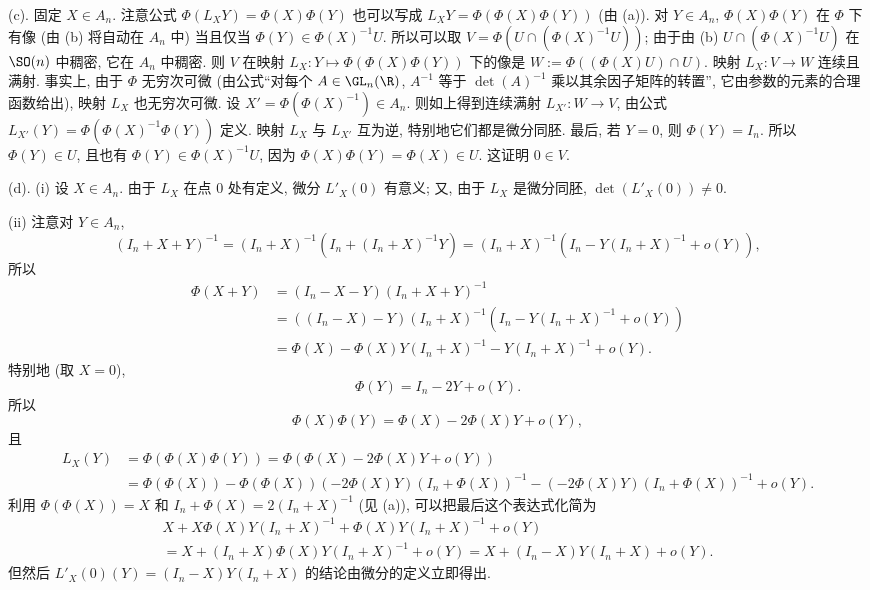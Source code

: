 \begin{solution}
(c). 固定 $X \in A_n$. 注意公式 $\Phi(L_XY) = \Phi(X)\Phi(Y)$ 也可以写成 $L_XY = \Phi(\Phi(X)\Phi(Y))$ (由 (a)).
对 $Y \in A_n$, $\Phi(X)\Phi(Y)$ 在 $\Phi$ 下有像 (由 (b) 将自动在 $A_n$ 中) 当且仅当 $\Phi(Y) \in \Phi(X)^{-1}U$. 所以可以取 $V = \Phi(U \cap (\Phi(X)^{-1}U))$; 由于由 (b) $U \cap (\Phi(X)^{-1}U)$ 在 $\SO(n)$ 中稠密, 它在 $A_n$ 中稠密. 则 $V$ 在映射 $L_X \colon Y \longmapsto \Phi(\Phi(X)\Phi(Y))$ 下的像是 $W := \Phi((\Phi(X)U) \cap U)$.
映射 $L_X \colon V \to W$ 连续且满射. 事实上, 由于 $\Phi$ 无穷次可微 (由公式``对每个 $A \in \GL_n(\R)$, $A^{-1}$ 等于 $\det(A)^{-1}$ 乘以其余因子矩阵的转置'', 它由参数的元素的合理函数给出), 映射 $L_X$ 也无穷次可微.
设 $X' = \Phi(\Phi(X)^{-1}) \in A_n$. 则如上得到连续满射 $L_{X'} \colon W \to V$, 由公式 $L_{X'}(Y) = \Phi(\Phi(X)^{-1}\Phi(Y))$ 定义. 映射 $L_X$ 与 $L_{X'}$ 互为逆, 特别地它们都是微分同胚.
最后, 若 $Y = 0$, 则 $\Phi(Y) = I_n$. 所以 $\Phi(Y) \in U$, 且也有 $\Phi(Y) \in \Phi(X)^{-1}U$, 因为 $\Phi(X)\Phi(Y) = \Phi(X) \in U$. 这证明 $0 \in V$.

(d). (i) 设 $X \in A_n$. 由于 $L_X$ 在点 $0$ 处有定义, 微分 $L'_X(0)$ 有意义; 又, 由于 $L_X$ 是微分同胚, $\det(L'_X(0)) \neq 0$.

(ii) 注意对 $Y \in A_n$,
\[
(I_n + X + Y)^{-1} = (I_n + X)^{-1}(I_n + (I_n + X)^{-1}Y) = (I_n + X)^{-1}(I_n - Y(I_n + X)^{-1} + o(Y)),
\]
所以
\begin{align*}
\Phi(X + Y) &= (I_n - X - Y)(I_n + X + Y)^{-1} \\
&= ((I_n - X) - Y)(I_n + X)^{-1}(I_n - Y(I_n + X)^{-1} + o(Y)) \\
&= \Phi(X) - \Phi(X)Y(I_n + X)^{-1} - Y(I_n + X)^{-1} + o(Y).
\end{align*}
特别地 (取 $X = 0$),
\[
\Phi(Y) = I_n - 2Y + o(Y).
\]
所以
\[
\Phi(X)\Phi(Y) = \Phi(X) - 2\Phi(X)Y + o(Y),
\]
且
\begin{align*}
L_X(Y) &= \Phi(\Phi(X)\Phi(Y)) = \Phi(\Phi(X) - 2\Phi(X)Y + o(Y)) \\
&= \Phi(\Phi(X)) - \Phi(\Phi(X))(-2\Phi(X)Y)(I_n + \Phi(X))^{-1} - (-2\Phi(X)Y)(I_n + \Phi(X))^{-1} + o(Y).
\end{align*}
利用 $\Phi(\Phi(X)) = X$ 和 $I_n + \Phi(X) = 2(I_n + X)^{-1}$ (见 (a)), 可以把最后这个表达式化简为
\begin{multline*}
X + X\Phi(X)Y(I_n + X)^{-1} + \Phi(X)Y(I_n + X)^{-1} + o(Y) \\
= X + (I_n + X)\Phi(X)Y(I_n + X)^{-1} + o(Y) = X + (I_n - X)Y(I_n + X) + o(Y).
\end{multline*}
但然后 $L'_X(0)(Y) = (I_n - X)Y(I_n + X)$ 的结论由微分的定义立即得出.


\end{solution}
